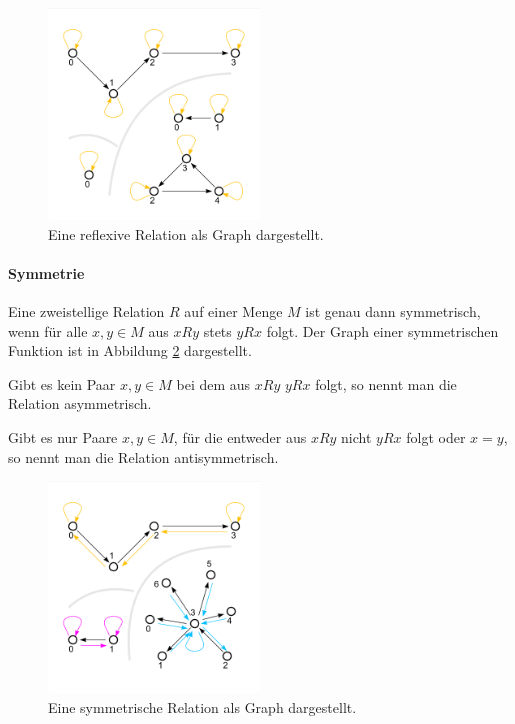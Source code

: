 \documentclass[../main.tex]{subfiles}
\begin{document}
                    \begin{figure}
                         \centering
                         \includegraphics[width=0.5\textwidth]{Abbildungen/Reflexivitaet_Graph.png}
                         \caption{Eine reflexive Relation als Graph dargestellt.}
                         \label{figure:Mathematik:FormaleGrundlagen:Reflexivitaet_Graph}
                    \end{figure}
                    
                \paragraph{Symmetrie}
                    Eine zweistellige Relation $R$ auf einer Menge $M$ ist genau dann symmetrisch, wenn für alle $x, y \in M$ aus $xRy$ stets $yRx$ folgt. Der Graph einer symmetrischen Funktion ist in Abbildung \ref{figure:Mathematik:FormaleGrundlagen:Symmetrie_Graph} dargestellt.
                    
                    Gibt es kein Paar $x, y \in M$ bei dem aus $xRy$ $yRx$ folgt, so nennt man die Relation asymmetrisch.
                    
                    Gibt es nur Paare $x, y \in M$, für die entweder aus $xRy$ nicht $yRx$ folgt oder $x = y$, so nennt man die Relation antisymmetrisch.
                    
                    
                    \begin{figure}
                         \centering
                         \includegraphics[width=0.5\textwidth]{Abbildungen/Symmetrie_Graph.png}
                         \caption{Eine symmetrische Relation als Graph dargestellt.}
                         \label{figure:Mathematik:FormaleGrundlagen:Symmetrie_Graph}
                    \end{figure}
                    
\end{document}
